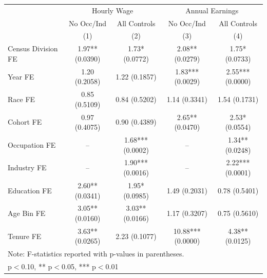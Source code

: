 \begin{tabular}{lcccc}
\hline\hline
 & \multicolumn{2}{c}{Hourly Wage} & \multicolumn{2}{c}{Annual Earnings} \\
 & No Occ/Ind & All Controls & No Occ/Ind & All Controls \\
 & (1) & (2) & (3) & (4) \\
\hline
Census Division FE&1.97** (0.0390)&1.73* (0.0772)&2.08** (0.0279)&1.75* (0.0733)\\
Year FE&1.20 (0.2058)&1.22 (0.1857)&1.83*** (0.0029)&2.55*** (0.0000)\\
Race FE&0.85 (0.5109)&0.84 (0.5202)&1.14 (0.3341)&1.54 (0.1731)\\
Cohort FE&0.97 (0.4075)&0.90 (0.4389)&2.65** (0.0470)&2.53* (0.0554)\\
Occupation FE&--&1.68*** (0.0002)&--&1.34** (0.0248)\\
Industry FE&--&1.90*** (0.0016)&--&2.22*** (0.0001)\\
Education FE&2.60** (0.0341)&1.95* (0.0985)&1.49 (0.2031)&0.78 (0.5401)\\
Age Bin FE&3.05** (0.0160)&3.03** (0.0166)&1.17 (0.3207)&0.75 (0.5610)\\
Tenure FE&3.63** (0.0265)&2.23 (0.1077)&10.88*** (0.0000)&4.38** (0.0125)\\
\hline
\multicolumn{5}{l}{\footnotesize Note: F-statistics reported with p-values in parentheses.} \\
\multicolumn{5}{l}{\footnotesize * p$<$0.10, ** p$<$0.05, *** p$<$0.01} \\
\hline\hline
\end{tabular}
